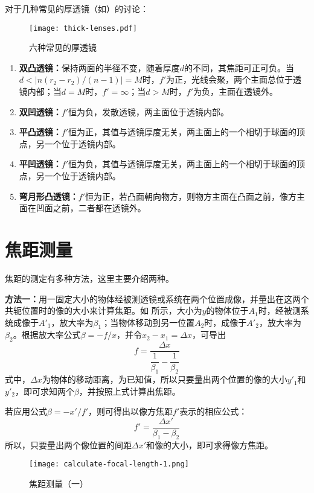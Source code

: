 对于几种常见的厚透镜（如）的讨论：
\begin{figure}[htbp]
	\centering
	\texttt{[image: thick-lenses.pdf]}
	\caption{六种常见的厚透镜}
	\label{fig:thick-lenses}
\end{figure}
\begin{enumerate}
	\item \textbf{双凸透镜：}保持两面的半径不变，随着厚度$d$的不同，其焦距可正可负。当$d<|n(r_2-r_2)/(n-1)|=M$时，$f'$为正，光线会聚，两个主面总位于透镜内部；当$d=M$时，$f'=\infty$；当$d>M$时，$f'$为负，主面在透镜外。
	\item \textbf{双凹透镜：}$f'$恒为负，发散透镜，两主面位于透镜内部。
	\item \textbf{平凸透镜：}$f'$恒为正，其值与透镜厚度无关，两主面上的一个相切于球面的顶点，另一个位于透镜内部。
	\item \textbf{平凹透镜：}$f'$恒为负，其值与透镜厚度无关，两主面上的一个相切于球面的顶点，另一个位于透镜内部。
	\item \textbf{弯月形凸透镜：}$f'$恒为正，若凸面朝向物方，则物方主面在凸面之前，像方主面在凹面之前，二者都在透镜外。
\end{enumerate}

\section{焦距测量}
焦距的测定有多种方法，这里主要介绍两种。

\textbf{方法一：}用一固定大小的物体经被测透镜或系统在两个位置成像，并量出在这两个共轭位置时的像的大小来计算焦距。如 所示，大小为$y$的物体位于$A_1$时，经被测系统成像于$A'_1$，放大率为$\beta_1$；当物体移动到另一位置$A_2$时，成像于$A'_2$，放大率为$\beta_2$。根据放大率公式$\beta=-f/x$，并令$x_2-x_1=\Delta x$，可导出
\begin{equation}
f=\frac{\Delta x}{\dfrac{1}{\beta_1}-\dfrac{1}{\beta_2}}
\end{equation}
式中，$\Delta x$为物体的移动距离，为已知值，所以只要量出两个位置的像的大小$y'_1$和$y'_2$，即可求知两个$\beta$，并按照上式计算出焦距。

若应用公式$\beta=-x'/f'$，则可得出以像方焦距$f'$表示的相应公式：
\begin{equation}
f'=\frac{\Delta x'}{\beta_1-\beta_2}
\end{equation}
所以，只要量出两个像位置的间距$\Delta x'$和像的大小，即可求得像方焦距。

\begin{figure}[htbp]
	\centering
	\texttt{[image: calculate-focal-length-1.png]}
	\caption{焦距测量（一）}
	\label{fig:calculate-focal-length-1}
\end{figure}

